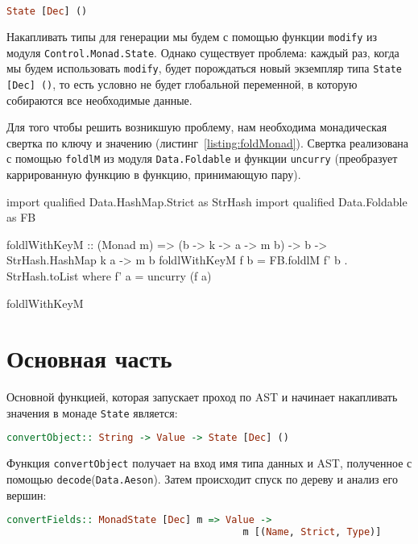 \begin{lstlisting}[language=Haskell]
State [Dec] ()
\end{lstlisting}

Накапливать типы для генерации мы будем с помощью функции \lstinline{modify} из модуля \lstinline{Control.Monad.State}. Однако существует проблема: каждый раз, когда мы будем использовать \lstinline{modify}, будет порождаться новый экземпляр типа \lstinline{State [Dec] ()}, то есть условно не будет глобальной переменной, в которую собираются все необходимые данные. 

Для того чтобы решить возникшую проблему, нам необходима монадическая свертка по ключу и значению (листинг~\ref{listing:foldMonad}). Свертка реализована с помощью \lstinline{foldlM} из модуля \lstinline{Data.Foldable} и функции \lstinline{uncurry} (преобразует каррированную функцию в функцию, принимающую пару).

\begin{ListingEnv}[H]
\begin{Verb}
import qualified Data.HashMap.Strict as StrHash
import qualified Data.Foldable    as FB

foldlWithKeyM :: (Monad m) => (b -> k -> a -> m b) -> b ->
                                       StrHash.HashMap k a -> m b
foldlWithKeyM f b = FB.foldlM f' b . StrHash.toList
  where f' a = uncurry (f a)
\end{Verb}
\caption{foldlWithKeyM}
\label{listing:foldMonad}
\end{ListingEnv} 

\section{Основная часть}

Основной функцией, которая запускает проход по AST и начинает накапливать значения в монаде \lstinline{State} является: 

\begin{lstlisting}[language=Haskell]
convertObject:: String -> Value -> State [Dec] ()
\end{lstlisting}

Функция \lstinline{convertObject} получает на вход имя типа данных и AST, полученное с помощью \lstinline{decode}(\lstinline{Data.Aeson}). Затем происходит спуск по дереву и анализ его вершин:

\begin{lstlisting}[language=Haskell]
convertFields:: MonadState [Dec] m => Value -> 
                                         m [(Name, Strict, Type)]
\end{lstlisting}


